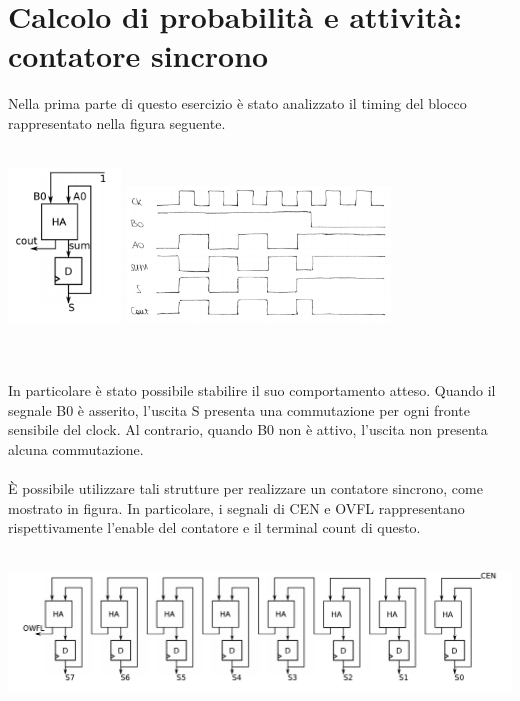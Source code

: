 \documentclass[11pt,  english, makeidx, a4paper, titlepage, oneside]{book}
\begin{document}
\section{Calcolo di probabilità e attività: contatore sincrono}
Nella prima parte di questo esercizio è stato analizzato il timing del blocco 
rappresentato nella figura seguente.
\\\\
\centerline{\includegraphics[width=3cm]{./img/Lab_1/Es_5/Sync_FA.png}
			\includegraphics[width=7cm]{./img/Lab_1/Es_5/Half_add_contatore.png}}
\\\\
In particolare è stato possibile stabilire il suo comportamento atteso. 
Quando il segnale B0 è asserito, l'uscita S presenta una commutazione 
per ogni fronte sensibile del clock. Al contrario, quando B0 non è attivo, 
l'uscita non presenta alcuna commutazione.
\\\\
È possibile utilizzare tali strutture per realizzare un contatore sincrono,
come mostrato in figura. In particolare, i segnali di CEN e OVFL rappresentano
rispettivamente l'enable del contatore e il terminal count di questo.
\\\\
\centerline{\includegraphics[width=15cm]{./img/Lab_1/Es_5/Counter.png}}
\\\\
\end{document}
